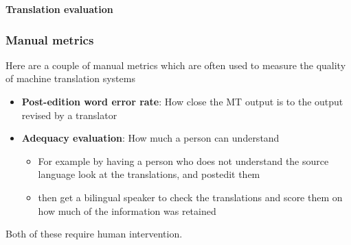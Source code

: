 \documentclass[10pt,xetex]{beamer} %
\begin{document}
%
%

\begin{frame} %
 \begin{center}
 {\Large {\bf Translation evaluation}} %
 \end{center}
\end{frame}

\begin{frame}
  \frametitle{Manual metrics}

Here are a couple of manual metrics which are often used to measure the 
quality of machine translation systems

\begin{itemize}

  \item {\bf Post-edition word error rate}: How close the MT output is to the 
    output revised by a translator
  \item {\bf Adequacy evaluation}: How much a person can understand
  \begin{itemize}
    \item For example by having a person who does not understand the 
      source language look at the translations, and postedit them
    \item then get a bilingual speaker to check the translations
      and score them on how much of the information was retained
  \end{itemize}
\end{itemize}

Both of these require human intervention.

\end{frame}
\end{document}
